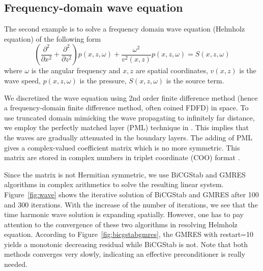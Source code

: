 \documentclass[10pt]{article}
\begin{document}
\subsection{Frequency-domain wave equation}

The second example is to solve a frequency domain wave equation (Helmholz equation) of the following form
\begin{equation}
\left(  \frac{\partial^2}{\partial x^2} + \frac{\partial^2}{\partial z^2}\right) p(x,z,\omega) + \frac{\omega^2}{v^2(x,z)} p(x,z,\omega) = S(x,z,\omega)
\end{equation}
where $\omega$ is the angular frequency and $x,z$ are spatial coordinates, $v(x,z)$ is the wave speed, $p(x,z,\omega)$ is the pressure, $S(x,z,\omega)$ is the source term.

We discretized the wave equation using 2nd order finite difference method (hence a frequency-domain finite difference method, often coined FDFD) in space. To use truncated domain mimicking the wave propagating to infinitely far distance, we employ the perfectly matched layer (PML) technique in \citep{Hustedt_2004_MGS}. This implies that the waves are gradually attenuated in the boundary layers. The adding of PML gives a complex-valued coefficient matrix which is no more symmetric. This matrix are stored in complex numbers in triplet coordinate (COO) format \citep{barrett1994templates}.

Since the matrix is not Hermitian symmetric, we use BiCGStab and GMRES algorithms in complex arithmetics to solve the resulting linear system. Figure~\ref{fig:wave} shows the iterative solution of BiCGStab and GMRES after 100 and 300 iterations. With the increase of the number of iterations, we see that the time harmonic wave solution is expanding spatially. However, one has to pay attention to the convergence of these two algorithms in resolving Helmholz equation. According to Figure~\ref{fig:bicgstabgmres}, the GMRES with restart=10 yields a monotonic decreasing residual while BiCGStab is not. Note that both methods converges very slowly, indicating an effective preconditioner is really needed.
\end{document}
